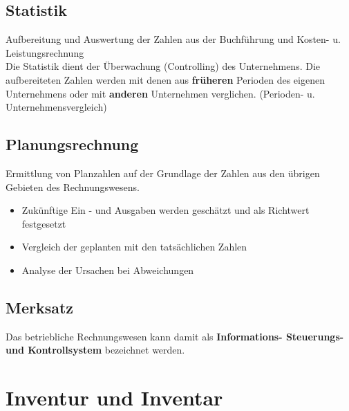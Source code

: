 \documentclass[a4paper,11pt]{scrartcl}	%
\begin{document}
\newpage
	
	\subsection{Statistik}
	Aufbereitung und Auswertung der Zahlen aus der Buchführung und Kosten- u. Leistungsrechnung \\[0.5cm]
	Die Statistik dient der Überwachung (Controlling) des Unternehmens. Die aufbereiteten Zahlen werden mit denen aus
	\textbf{früheren} Perioden des eigenen Unternehmens oder mit \textbf{anderen} Unternehmen verglichen.
	(Perioden- u. Unternehmensvergleich)
	
	\subsection{Planungsrechnung}
	Ermittlung von Planzahlen auf der Grundlage der Zahlen aus den übrigen Gebieten des Rechnungswesens.
	
		\begin{itemize}
			\item Zukünftige Ein - und Ausgaben werden geschätzt und als Richtwert festgesetzt
			\item Vergleich der geplanten mit den tatsächlichen Zahlen
			\item Analyse der Ursachen bei Abweichungen
		\end{itemize}
		
	\subsection{Merksatz}
	Das betriebliche Rechnungswesen kann damit als \textbf{Informations- Steuerungs- und Kontrollsystem} bezeichnet werden.
	
\section{Inventur und Inventar}
\end{document}

